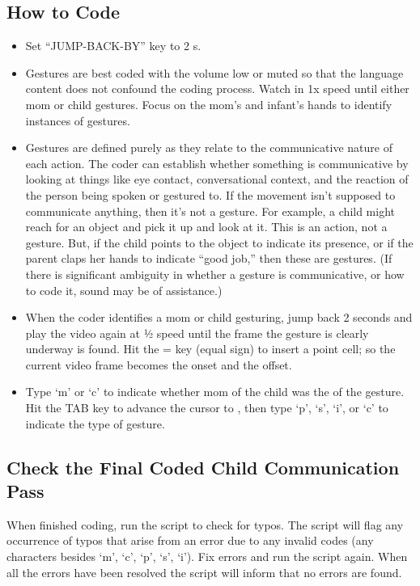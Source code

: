 \documentclass[
]{book}
\providecommand{\tightlist}{%
  \setlength{\itemsep}{0pt}\setlength{\parskip}{0pt}}
\begin{document}
\hypertarget{how-to-code-1}{%
\subsection{How to Code}\label{how-to-code-1}}

\begin{itemize}
\tightlist
\item
  Set ``JUMP-BACK-BY'' key to 2 s.
\item
  Gestures are best coded with the volume low or muted so that the language content does not confound the coding process.
  Watch in 1x speed until either mom or child gestures. Focus on the mom's and infant's hands to identify instances of gestures.
\item
  Gestures are defined purely as they relate to the communicative nature of each action. The coder can establish whether something is communicative by looking at things like eye contact, conversational context, and the reaction of the person being spoken or gestured to. If the movement isn't supposed to communicate anything, then it's not a gesture. For example, a child might reach for an object and pick it up and look at it. This is an action, not a gesture. But, if the child points to the object to indicate its presence, or if the parent claps her hands to indicate ``good job,'' then these are gestures. (If there is significant ambiguity in whether a gesture is communicative, or how to code it, sound may be of assistance.)
\item
  When the coder identifies a mom or child gesturing, jump back 2 seconds and play the video again at ½ speed until the frame the gesture is clearly underway is found. Hit the = key (equal sign) to insert a point cell; so the current video frame becomes the onset and the offset.
\item
  Type `m' or `c' to indicate whether mom of the child was the of the gesture. Hit the TAB key to advance the cursor to , then type `p', `s', `i', or `c' to indicate the type of gesture.
\end{itemize}

\hypertarget{check-the-final-coded-child-communication-pass}{%
\subsection{Check the Final Coded Child Communication Pass}\label{check-the-final-coded-child-communication-pass}}

When finished coding, run the script to check for typos. The script will flag any occurrence of typos that arise from an error due to any invalid codes (any characters besides `m', `c', `p', `s', `i'). Fix errors and run the script again. When all the errors have been resolved the script will inform that no errors are found.
\end{document}
